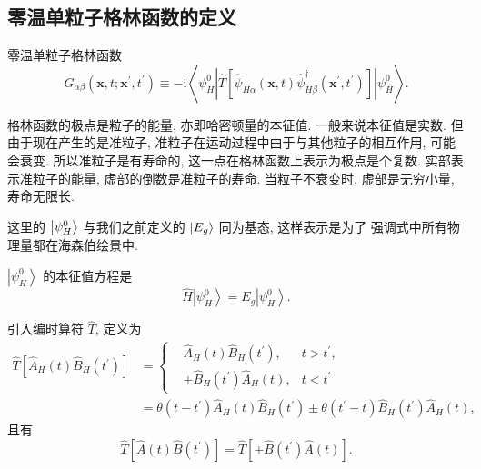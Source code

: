 \subsection{零温单粒子格林函数的定义}
\begin{definition}{零温单粒子格林函数}{}
\begin{equation}
G_{\alpha \beta}\left(\boldsymbol{x}, t ; \boldsymbol{x}^{\prime}, t^{\prime}\right) \equiv-\mathrm{i}\left\langle\psi_{H}^{0}\left|\hat{T}\left[\hat{\psi}^{}_{H \alpha}(\boldsymbol{x}, t) \hat{\psi}_{H \beta}^{\dagger}\left(\boldsymbol{x}^{\prime}, t^{\prime}\right)\right]\right| \psi_{H}^{0}\right\rangle .
\end{equation}
\end{definition}
\begin{note}
    格林函数的极点是粒子的能量, 亦即哈密顿量的本征值. 一般来说本征值是实数. 但由于现在产生的是准粒子, 准粒子在运动过程中由于与其他粒子的相互作用, 可能会衰变.
    所以准粒子是有寿命的, 这一点在格林函数上表示为极点是个复数. 实部表示准粒子的能量, 虚部的倒数是准粒子的寿命. 当粒子不衰变时, 虚部是无穷小量, 寿命无限长. 
    
    这里的 $\left| \psi_H^0 \right\rangle$ 与我们之前定义的 $\left| E_g \right\rangle$ 同为基态, 这样表示是为了
    强调式中所有物理量都在海森伯绘景中.
\end{note}
$\left|\psi_{H}^{0}\right\rangle$ 的本征值方程是
\begin{equation}
\hat{H}\left|\psi_{H}^{0}\right\rangle=E_{g}\left|\psi_{H}^{0}\right\rangle .
\end{equation}

引入编时算符 $\hat{T}$, 定义为
\begin{align}
\hat{T}\left[\hat{A}_{H}(t) \hat{B}_{H}\left(t^{\prime}\right)\right]&=\left\{\begin{aligned}
&\hat{A}_{H}(t) \hat{B}_{H}\left(t^{\prime}\right), &t>t^{\prime}, \\
&\pm \hat{B}_{H}\left(t^{\prime}\right) \hat{A}_{H}(t), &t<t^{\prime}
\end{aligned}\right. \nonumber\\
&=\theta(t-t^\prime)\hat{A}_{H}(t) \hat{B}_{H}\left(t^{\prime}\right)\pm\theta(t^\prime-t)\hat{B}_{H}\left(t^{\prime} \right)\hat{A}_{H}(t),
\end{align}
且有
\begin{equation}
\hat{T}\left[\hat{A}(t) \hat{B}\left(t^{\prime}\right)\right]=\hat{T}\left[\pm \hat{B}\left(t^{\prime}\right) \hat{A}(t)\right].
\end{equation}

